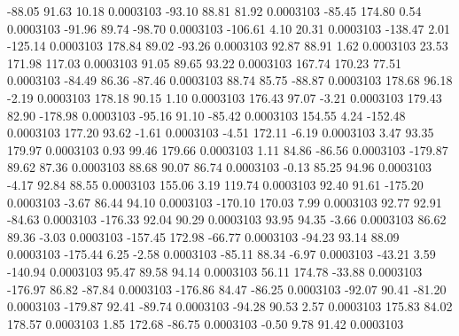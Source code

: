       -88.05       91.63       10.18     0.0003103
      -93.10       88.81       81.92     0.0003103
      -85.45      174.80        0.54     0.0003103
      -91.96       89.74      -98.70     0.0003103
     -106.61        4.10       20.31     0.0003103
     -138.47        2.01     -125.14     0.0003103
      178.84       89.02      -93.26     0.0003103
       92.87       88.91        1.62     0.0003103
       23.53      171.98      117.03     0.0003103
       91.05       89.65       93.22     0.0003103
      167.74      170.23       77.51     0.0003103
      -84.49       86.36      -87.46     0.0003103
       88.74       85.75      -88.87     0.0003103
      178.68       96.18       -2.19     0.0003103
      178.18       90.15        1.10     0.0003103
      176.43       97.07       -3.21     0.0003103
      179.43       82.90     -178.98     0.0003103
      -95.16       91.10      -85.42     0.0003103
      154.55        4.24     -152.48     0.0003103
      177.20       93.62       -1.61     0.0003103
       -4.51      172.11       -6.19     0.0003103
        3.47       93.35      179.97     0.0003103
        0.93       99.46      179.66     0.0003103
        1.11       84.86      -86.56     0.0003103
     -179.87       89.62       87.36     0.0003103
       88.68       90.07       86.74     0.0003103
       -0.13       85.25       94.96     0.0003103
       -4.17       92.84       88.55     0.0003103
      155.06        3.19      119.74     0.0003103
       92.40       91.61     -175.20     0.0003103
       -3.67       86.44       94.10     0.0003103
     -170.10      170.03        7.99     0.0003103
       92.77       92.91      -84.63     0.0003103
     -176.33       92.04       90.29     0.0003103
       93.95       94.35       -3.66     0.0003103
       86.62       89.36       -3.03     0.0003103
     -157.45      172.98      -66.77     0.0003103
      -94.23       93.14       88.09     0.0003103
     -175.44        6.25       -2.58     0.0003103
      -85.11       88.34       -6.97     0.0003103
      -43.21        3.59     -140.94     0.0003103
       95.47       89.58       94.14     0.0003103
       56.11      174.78      -33.88     0.0003103
     -176.97       86.82      -87.84     0.0003103
     -176.86       84.47      -86.25     0.0003103
      -92.07       90.41      -81.20     0.0003103
     -179.87       92.41      -89.74     0.0003103
      -94.28       90.53        2.57     0.0003103
      175.83       84.02      178.57     0.0003103
        1.85      172.68      -86.75     0.0003103
       -0.50        9.78       91.42     0.0003103
